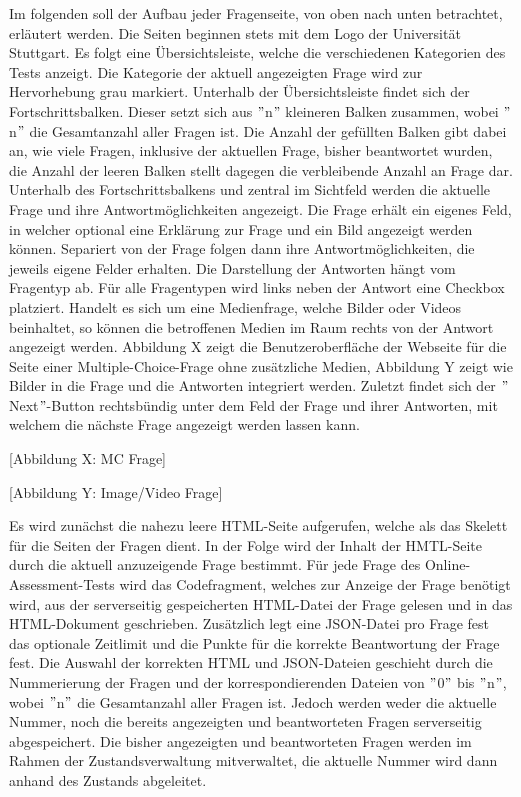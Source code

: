 Im folgenden soll der Aufbau jeder Fragenseite, von oben nach unten betrachtet, erläutert werden. Die Seiten beginnen stets mit dem Logo der Universität Stuttgart. Es folgt eine Übersichtsleiste, welche die verschiedenen Kategorien des Tests anzeigt. Die Kategorie der aktuell angezeigten Frage wird zur Hervorhebung grau markiert. Unterhalb der Übersichtsleiste findet sich der Fortschrittsbalken. Dieser setzt sich aus $"$n$"$ kleineren Balken zusammen, wobei $"$n$"$ die Gesamtanzahl aller Fragen ist. Die Anzahl der gefüllten Balken gibt dabei an, wie viele Fragen, inklusive der aktuellen Frage, bisher beantwortet wurden, die Anzahl der leeren Balken stellt dagegen die verbleibende Anzahl an Frage dar. Unterhalb des Fortschrittsbalkens und zentral im Sichtfeld werden die aktuelle Frage und ihre Antwortmöglichkeiten angezeigt. Die Frage erhält ein eigenes Feld, in welcher optional eine Erklärung zur Frage und ein Bild angezeigt werden können. Separiert von der Frage folgen dann ihre Antwortmöglichkeiten, die jeweils eigene Felder erhalten. Die Darstellung der Antworten hängt vom Fragentyp ab. Für alle Fragentypen wird links neben der Antwort eine Checkbox platziert. Handelt es sich um eine Medienfrage, welche Bilder oder Videos beinhaltet, so können die betroffenen Medien im Raum rechts von der Antwort angezeigt werden. Abbildung X zeigt die Benutzeroberfläche der Webseite für die Seite einer Multiple-Choice-Frage ohne zusätzliche Medien, Abbildung Y zeigt wie Bilder in die Frage und die Antworten integriert werden. Zuletzt findet sich der $"$Next$"$-Button rechtsbündig unter dem Feld der Frage und ihrer Antworten, mit welchem die nächste Frage angezeigt werden lassen kann.

[Abbildung X: MC Frage]

[Abbildung Y: Image/Video Frage]

Es wird zunächst die nahezu leere HTML-Seite aufgerufen, welche als das Skelett für die Seiten der Fragen dient. In der Folge wird der Inhalt der HMTL-Seite durch die aktuell anzuzeigende Frage bestimmt. Für jede Frage des Online-Assessment-Tests wird das Codefragment, welches zur Anzeige der Frage benötigt wird, aus der serverseitig gespeicherten HTML-Datei der Frage gelesen und in das HTML-Dokument geschrieben. Zusätzlich legt eine JSON-Datei pro Frage fest das optionale Zeitlimit und die Punkte für die korrekte Beantwortung der Frage fest. Die Auswahl der korrekten HTML und JSON-Dateien geschieht durch die Nummerierung der Fragen und der korrespondierenden Dateien von $"$0$"$ bis $"$n$"$, wobei $"$n$"$ die Gesamtanzahl aller Fragen ist. Jedoch werden weder die aktuelle Nummer, noch die bereits angezeigten und beantworteten Fragen serverseitig abgespeichert. Die bisher angezeigten und beantworteten Fragen werden im Rahmen der Zustandsverwaltung mitverwaltet, die aktuelle Nummer wird dann anhand des Zustands abgeleitet.

